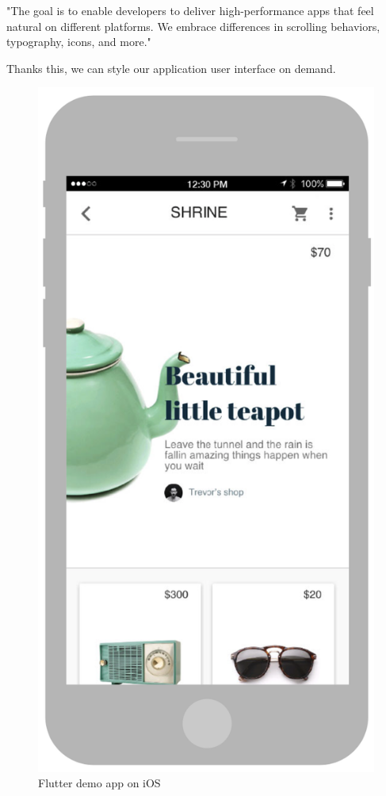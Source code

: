 "The goal is to enable developers to deliver high-performance apps that feel natural on different platforms.
We embrace differences in scrolling behaviors, typography, icons, and more."\cite{flutterTechnicalOverview}

Thanks this, we can style our application user interface on demand.

\begin{figure}
    \centering
    \begin{minipage}{.45\textwidth}
        \centering
        \includegraphics[width=.7\linewidth]{assets/hero-shrine-ios.png}
        \caption{Flutter demo app on iOS \cite{flutterTechnicalOverview}}
        \label{fig:flutter-demo-app-ios}
    \end{minipage}%
    \hspace{.05\linewidth}
    \begin{minipage}{.45\textwidth}

\end{minipage}
\end{figure}
